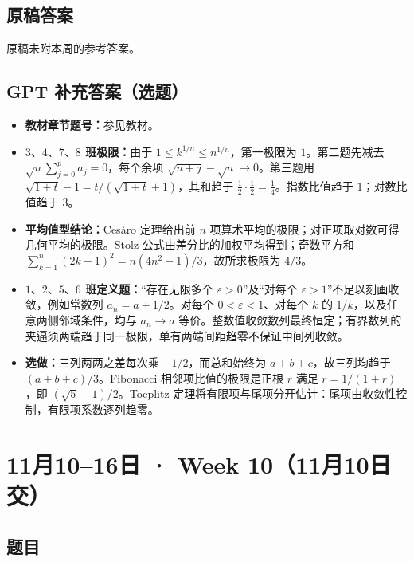 \documentclass[UTF8,11pt, a4paper, oneside, fontset=none]{ctexbook}
\begin{document}
\subsection*{原稿答案}
\noindent 原稿未附本周的参考答案。
\clearpage
\subsection*{GPT 补充答案（选题）}
\begin{itemize}
\item \textbf{教材章节题号：}参见教材。
\item \textbf{$3、4、7、8$ 班极限：}由于 $1\le k^{1/n}\le n^{1/n}$，第一极限为 $1$。第二题先减去 $\sqrt n\sum_{j=0}^p a_j=0$，每个余项 $\sqrt{n+j}-\sqrt n\to0$。第三题用 $\sqrt{1+t}-1=t/(\sqrt{1+t}+1)$，其和趋于 $\tfrac12\cdot\tfrac12=\tfrac14$。指数比值趋于 $1$；对数比值趋于 $3$。
\item \textbf{平均值型结论：}Cesàro 定理给出前 $n$ 项算术平均的极限；对正项取对数可得几何平均的极限。Stolz 公式由差分比的加权平均得到；奇数平方和 $\sum_{k=1}^n(2k-1)^2=n(4n^2-1)/3$，故所求极限为 $4/3$。
\item \textbf{$1、2、5、6$ 班定义题：}“存在无限多个 $\varepsilon>0$”及“对每个 $\varepsilon>1$”不足以刻画收敛，例如常数列 $a_n=a+1/2$。对每个 $0<\varepsilon<1$、对每个 $k$ 的 $1/k$，以及任意两侧邻域条件，均与 $a_n\to a$ 等价。整数值收敛数列最终恒定；有界数列的夹逼须两端趋于同一极限，单有两端间距趋零不保证中间列收敛。
\item \textbf{选做：}三列两两之差每次乘 $-1/2$，而总和始终为 $a+b+c$，故三列均趋于 $(a+b+c)/3$。Fibonacci 相邻项比值的极限是正根 $r$ 满足 $r=1/(1+r)$，即 $(\sqrt5-1)/2$。Toeplitz 定理将有限项与尾项分开估计：尾项由收敛性控制，有限项系数逐列趋零。
\end{itemize}
\clearpage
\section{11月10--16日 · Week 10（11月10日交）}
\subsection*{题目}
\end{document}

